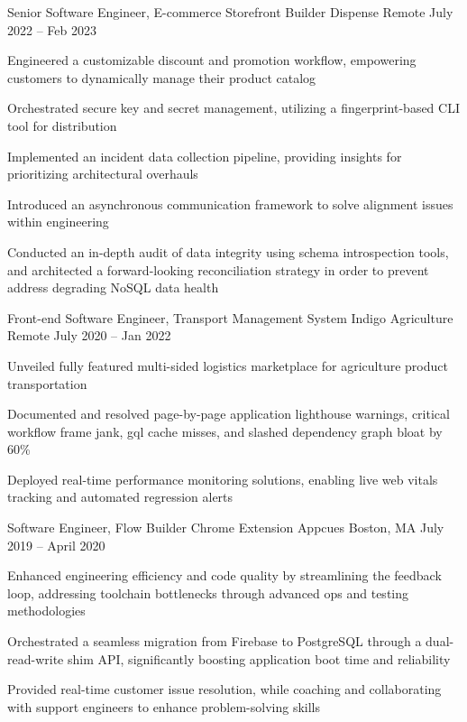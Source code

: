 \documentclass[]{awesome-cv}
\begin{document}
\begin{cventries}
	\cventry
	{Senior Software Engineer, E-commerce Storefront Builder}
	{Dispense}
	{Remote}
	{July 2022 – Feb 2023}
	{\begin{cvitems}
		\item {Engineered a customizable discount and promotion workflow, empowering customers to dynamically manage their product catalog}
		\item {Orchestrated secure key and secret management, utilizing a fingerprint-based CLI tool for distribution}
		\item {Implemented an incident data collection pipeline, providing insights for prioritizing architectural overhauls}
		\item {Introduced an asynchronous communication framework to solve alignment issues within engineering}
		\item {Conducted an in-depth audit of data integrity using schema introspection tools, and architected a forward-looking reconciliation strategy in order to prevent address degrading NoSQL data health}
		\end{cvitems}}
	\cventry
	{Front-end Software Engineer, Transport Management System}
	{Indigo Agriculture}
	{Remote}
	{July 2020 – Jan 2022}
	{\begin{cvitems}
		\item {Unveiled fully featured multi-sided logistics marketplace for agriculture product transportation}
		\item {Documented and resolved page-by-page application lighthouse warnings, critical workflow frame jank, gql cache misses, and slashed dependency graph bloat by 60\%}
		\item {Deployed real-time performance monitoring solutions, enabling live web vitals tracking and automated regression alerts}
		\end{cvitems}}
	\cventry
	{Software Engineer, Flow Builder Chrome Extension}
	{Appcues}
	{Boston, MA}
	{July 2019 – April 2020}
	{\begin{cvitems}
		\item {Enhanced engineering efficiency and code quality by streamlining the feedback loop, addressing toolchain bottlenecks through advanced ops and testing methodologies}
		\item {Orchestrated a seamless migration from Firebase to PostgreSQL through a dual-read-write shim API, significantly boosting application boot time and reliability}
		\item {Provided real-time customer issue resolution, while coaching and collaborating with support engineers to enhance problem-solving skills}

\end{cvitems}}
\end{cventries}
\end{document}

